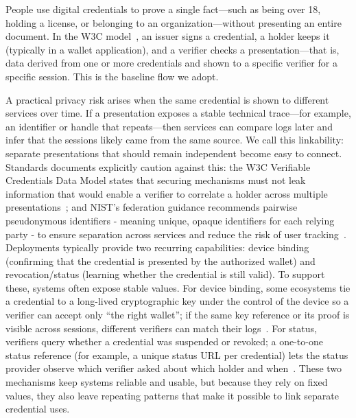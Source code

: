 People use digital credentials to prove a single fact—such as being over 18, holding a license, or belonging to an organization—without presenting an entire document. In the W3C model~\cite{w3c-vc-data-model-2}, an issuer signs a credential, a holder keeps it (typically in a wallet application), and a verifier checks a presentation—that is, data derived from one or more credentials and shown to a specific verifier for a specific session. This is the baseline flow we adopt.

A practical privacy risk arises when the same credential is shown to different services over time. If a presentation exposes a stable technical trace—for example, an identifier or handle that repeats—then services can compare logs later and infer that the sessions likely came from the same source.
We call this linkability: separate presentations that should remain independent become easy to connect. Standards documents explicitly caution against this: the W3C Verifiable Credentials Data Model states that securing mechanisms must not leak information that would enable a verifier to correlate a holder across multiple presentations~\cite{w3c-vc-data-model-2}; and NIST’s federation guidance recommends pairwise pseudonymous identifiers - meaning unique, opaque identifiers for each relying party - to ensure separation across services and reduce the risk of user tracking~\cite{nist-sp800-63c}.
Deployments typically provide two recurring capabilities: device binding (confirming that the credential is presented by the authorized wallet) and revocation/status (learning whether the credential is still valid). To support these, systems often expose stable values.
For device binding, some ecosystems tie a credential to a long-lived cryptographic key under the control of the device so a verifier can accept only “the right wallet”; if the same key reference or its proof is visible across sessions, different verifiers can match their logs~\cite{IETF:FetYasCam25}.
For status, verifiers query whether a credential was suspended or revoked; a one-to-one status reference (for example, a unique status URL per credential) lets the status provider observe which verifier asked about which holder and when~\cite{w3c-vc-data-model-2}.
These two mechanisms keep systems reliable and usable, but because they rely on fixed values, they also leave repeating patterns that make it possible to link separate credential uses.

